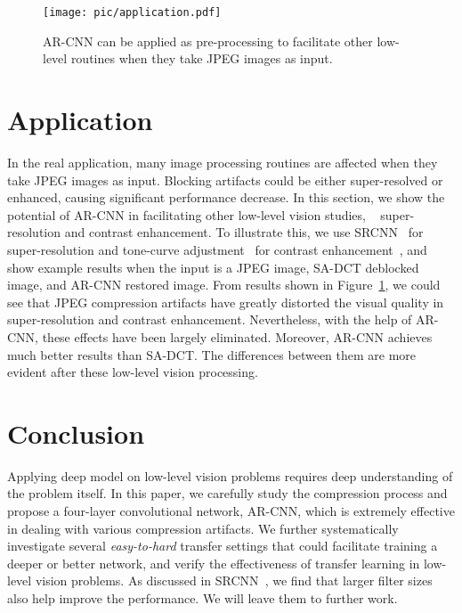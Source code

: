 \documentclass[10pt,twocolumn,letterpaper]{article}
\begin{document}
\begin{figure}[t]\small
\begin{center}
 \texttt{[image: pic/application.pdf]}
\caption{AR-CNN can be applied as pre-processing to facilitate other low-level routines when they take JPEG images as input.}
\label{fig:application}
\vspace{-0.75cm}
\end{center}
\end{figure}

\section{Application}

In the real application, many image processing routines are affected when they take JPEG images as input. Blocking artifacts could be either super-resolved or enhanced, causing significant performance decrease. In this section, we show the potential of AR-CNN in facilitating other low-level vision studies, \ie~ super-resolution and contrast enhancement.
To illustrate this, we use SRCNN~\cite{Dong2014} for super-resolution and tone-curve adjustment~\cite{Li2014} for contrast enhancement~\cite{Dollar2013}, and show example results when the input is a JPEG image, SA-DCT deblocked image, and AR-CNN restored image. From results shown in Figure~\ref{fig:application}, we could see that JPEG compression artifacts have greatly distorted the visual quality in super-resolution and contrast enhancement. Nevertheless, with the help of AR-CNN, these effects have been largely eliminated. Moreover, AR-CNN achieves much better results than SA-DCT. The differences between them are more evident after these low-level vision processing.



\section{Conclusion}

Applying deep model on low-level vision problems requires deep understanding of the problem itself. In this paper, we carefully study the compression process and propose a four-layer convolutional network, AR-CNN, which is extremely effective in dealing with various compression artifacts. We further systematically investigate several \textit{easy-to-hard} transfer settings that could facilitate training a deeper or better network, and verify the effectiveness of transfer learning in low-level vision problems.
As discussed in SRCNN~\cite{Dong2014}, we find that larger filter sizes also help improve the performance. We will leave them to further work.


\clearpage
{\small


}
\end{document}
